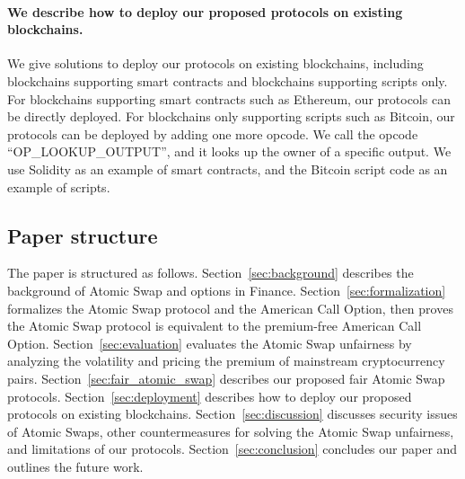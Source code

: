 \paragraph{We describe how to deploy our proposed protocols on existing blockchains.}
We give solutions to deploy our protocols on existing blockchains, including blockchains supporting smart contracts and blockchains supporting scripts only.
For blockchains supporting smart contracts such as Ethereum, our protocols can be directly deployed.
For blockchains only supporting scripts such as Bitcoin, our protocols can be deployed by adding one more opcode.
We call the opcode ``OP\_LOOKUP\_OUTPUT'', and it looks up the owner of a specific output.
We use Solidity as an example of smart contracts, and the Bitcoin script code as an example of scripts.

\subsection{Paper structure}

The paper is structured as follows.
Section~\ref{sec:background} describes the background of Atomic Swap and options in Finance.
Section~\ref{sec:formalization} formalizes the Atomic Swap protocol and the American Call Option, then proves the Atomic Swap protocol is equivalent to the premium-free American Call Option.
Section~\ref{sec:evaluation} evaluates the Atomic Swap unfairness by analyzing the volatility and pricing the premium of mainstream cryptocurrency pairs.
Section~\ref{sec:fair_atomic_swap} describes our proposed fair Atomic Swap protocols.
Section~\ref{sec:deployment} describes how to deploy our proposed protocols on existing blockchains.
Section~\ref{sec:discussion} discusses security issues of Atomic Swaps, other countermeasures for solving the Atomic Swap unfairness, and limitations of our protocols.
Section~\ref{sec:conclusion} concludes our paper and outlines the future work.